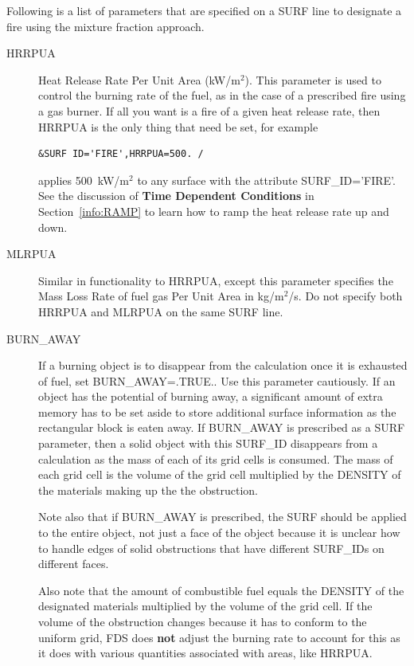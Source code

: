 \documentclass[11pt]{book}
\begin{document}
Following is a list of parameters that
are specified on a {\ct SURF} line to designate a fire using the mixture fraction approach.
\begin{description}
\item[{\ct HRRPUA}]
Heat Release Rate Per Unit Area (kW/m$^2$). This parameter is used to
control the burning rate of the fuel, as in the case of a prescribed
fire using a gas burner. If all you want is a fire of a given heat
release rate, then {\ct HRRPUA} is the only thing that need be set,
for example

\footnotesize
\begin{verbatim}
&SURF ID='FIRE',HRRPUA=500. /
\end{verbatim}
\normalsize
applies 500~kW/m$^2$ to any surface with the attribute
{\ct SURF\_ID='FIRE'}. See the discussion of {\bf Time Dependent Conditions}
in Section~\ref{info:RAMP} to learn how to ramp the heat release rate up and down.
\item[{\ct MLRPUA}] Similar in functionality to {\ct HRRPUA}, except this parameter
specifies the Mass Loss Rate of fuel gas Per Unit Area in kg/m$^2$/s. Do not specify both
{\ct HRRPUA} and {\ct MLRPUA} on the same {\ct SURF} line.
\item[{\ct BURN\_AWAY}] If a burning object is to disappear from the
calculation once it is exhausted of fuel, set {\ct BURN\_AWAY=.TRUE.}.
Use this parameter cautiously. If an object has the potential of
burning away, a significant amount of extra memory has to be set aside
to store additional surface information as the rectangular block is
eaten away. If {\ct BURN\_AWAY} is prescribed as a {\ct SURF} parameter, then a solid
object with this {\ct SURF\_ID} disappears from a calculation as
the mass of each of its grid cells is consumed. The mass of each grid
cell is the volume of the grid cell multiplied by the {\ct DENSITY} of the
materials making up the the obstruction.

\begin{warning}
\noindent
Note also that if {\ct BURN\_AWAY} is prescribed, the {\ct SURF} should be applied to the
entire object, not just a face of the object because it is unclear how to handle edges
of solid obstructions that have different {\ct SURF\_ID}s on different faces.
\end{warning}

Also note that the amount of combustible fuel equals the {\ct DENSITY} of the designated materials
multiplied by the volume of the grid cell. If the volume of the obstruction changes because it has
to conform to the uniform grid, FDS does {\bf not} adjust the burning rate to account for this as
it does with various quantities associated with areas, like {\ct HRRPUA}.
\end{description}
\end{document}
